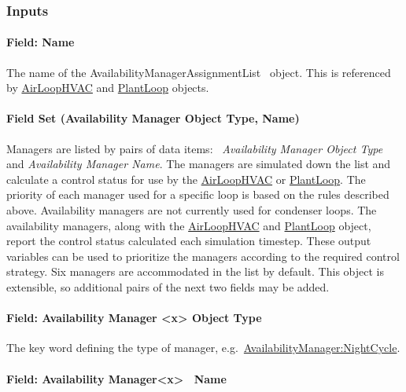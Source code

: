 \subsubsection{Inputs}\label{inputs-2-002}

\paragraph{Field: Name}\label{field-name-2-001}

The name of the AvailabilityManagerAssignmentList ~object. This is referenced by \hyperref[airloophvac]{AirLoopHVAC} and \hyperref[plantloop]{PlantLoop} objects.

\paragraph{Field Set (Availability Manager Object Type, Name)}\label{field-set-availability-manager-object-type-name}

Managers are listed by pairs of data items:~ \emph{Availability Manager Object Type} and \emph{Availability Manager Name}. The managers are simulated down the list and calculate a control status for use by the \hyperref[airloophvac]{AirLoopHVAC} or \hyperref[plantloop]{PlantLoop}. The priority of each manager used for a specific loop is based on the rules described above. Availability managers are not currently used for condenser loops. The availability managers, along with the \hyperref[airloophvac]{AirLoopHVAC} and \hyperref[plantloop]{PlantLoop} object, report the control status calculated each simulation timestep. These output variables can be used to prioritize the managers according to the required control strategy. Six managers are accommodated in the list by default.  This object is extensible, so additional pairs of the next two fields may be added.

\paragraph{Field: Availability Manager \textless{}x\textgreater{} Object Type}\label{field-availability-manager-x-object-type}

The key word defining the type of manager, e.g.~\hyperref[availabilitymanagernightcycle]{AvailabilityManager:NightCycle}.

\paragraph{Field: Availability Manager\textless{}x\textgreater{}~ Name}\label{field-availability-managerx-name}

